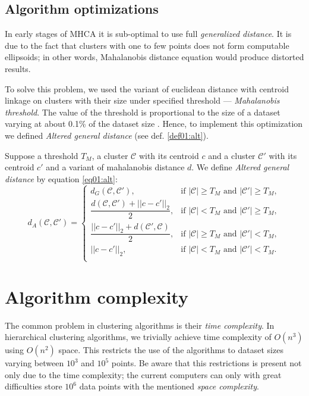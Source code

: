 \subsection{Algorithm optimizations}

In early stages of MHCA it is sub-optimal to use full \emph{generalized distance}. It is due to the fact that clusters with one to few points does not form computable ellipsoids; in other words, Mahalanobis distance equation would produce distorted results. 

To solve this problem, we used the variant of euclidean distance with centroid linkage on clusters with their size under specified threshold --- \emph{Mahalanobis threshold}. The value of the threshold is proportional to the size of a dataset varying at about 0.1\% of the dataset size \cite{fivser2012detection}. Hence, to implement this optimization we defined \emph{Altered general distance} (see def. \ref{def01:alt}).

\begin{defn}
	Suppose a threshold $T_M$, a cluster $\mathcal{C}$ with its centroid $c$ and a cluster $\mathcal{C}'$ with its centroid $c'$ and a variant of mahalanobis distance $d$. We define \emph{Altered general distance} by equation \ref{eq01:alt}:
	\begin{equation}
	d_A(\mathcal{C},\mathcal{C}')=
	\begin{cases}
	d_G(\mathcal{C}, \mathcal{C}'), & \text{if $|\mathcal{C}|\ge T_M$ and $|\mathcal{C}'|\ge T_M$},\\
	\dfrac{d(\mathcal{C}, \mathcal{C}')+||c-c'||_2}{2}, & \text{if $|\mathcal{C}| < T_M$ and $|\mathcal{C}'|\ge T_M$},\\
	\dfrac{||c-c'||_2+d(\mathcal{C}', \mathcal{C})}{2}, & \text{if $|\mathcal{C}|\ge T_M$ and $|\mathcal{C}'|< T_M$},\\
	||c-c'||_2, & \text{if $|\mathcal{C}|< T_M$ and $|\mathcal{C}'|< T_M$}.\\
	\end{cases}
	\label{eq01:alt}
	\end{equation}
	\label{def01:alt}
\end{defn}



\section{Algorithm complexity}

The common problem in clustering algorithms is their \emph{time complexity}. In hierarchical clustering algorithms, we trivially achieve time complexity of $O(n^3)$ using $O(n^2)$ space. This restricts the use of the algorithms to dataset sizes varying between $10^3$ and $10^5$ points. Be aware that this restrictions is present not only due to the time complexity; the current computers can only with great difficulties store $10^6$ data points with the mentioned \emph{space complexity}.

